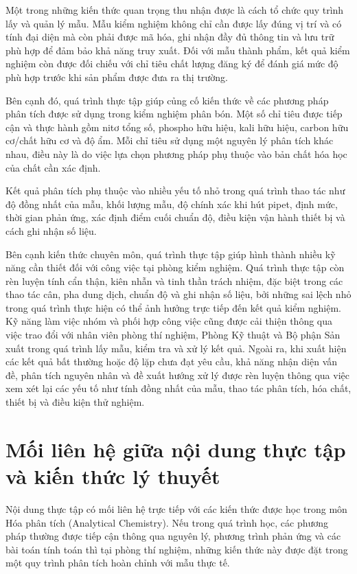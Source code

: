 Một trong những kiến thức quan trọng thu nhận được là cách tổ chức quy trình lấy và quản lý mẫu. 
Mẫu kiểm nghiệm không chỉ cần được lấy đúng vị trí và có tính đại diện mà còn phải được mã hóa, ghi nhận đầy đủ thông tin và lưu trữ phù hợp để đảm bảo khả năng truy xuất. 
Đối với mẫu thành phẩm, kết quả kiểm nghiệm còn được đối chiếu với chỉ tiêu chất lượng đăng ký để đánh giá mức độ phù hợp trước khi sản phẩm được đưa ra thị trường.

Bên cạnh đó, quá trình thực tập giúp củng cố kiến thức về các phương pháp phân tích được sử dụng trong kiểm nghiệm phân bón. 
Một số chỉ tiêu được tiếp cận và thực hành gồm nitơ tổng số, phospho hữu hiệu, kali hữu hiệu, carbon hữu cơ/chất hữu cơ và độ ẩm. 
Mỗi chỉ tiêu sử dụng một nguyên lý phân tích khác nhau, điều này là do việc lựa chọn phương pháp phụ thuộc vào bản chất hóa học của chất cần xác định.

Kết quả phân tích phụ thuộc vào nhiều yếu tố nhỏ trong quá trình thao tác như độ đồng nhất của mẫu, khối lượng mẫu, độ chính xác khi hút pipet, định mức, thời gian phản ứng, xác định điểm cuối chuẩn độ, điều kiện vận hành thiết bị và cách ghi nhận số liệu.

Bên cạnh kiến thức chuyên môn, quá trình thực tập giúp hình thành nhiều kỹ năng cần thiết đối với công việc tại phòng kiểm nghiệm. 
Quá trình thực tập còn rèn luyện tính cẩn thận, kiên nhẫn và tinh thần trách nhiệm, đặc biệt trong các thao tác cân, pha dung dịch, chuẩn độ và ghi nhận số liệu, bởi những sai lệch nhỏ trong quá trình thực hiện có thể ảnh hưởng trực tiếp đến kết quả kiểm nghiệm. 
Kỹ năng làm việc nhóm và phối hợp công việc cũng được cải thiện thông qua việc trao đổi với nhân viên phòng thí nghiệm, Phòng Kỹ thuật và Bộ phận Sản xuất trong quá trình lấy mẫu, kiểm tra và xử lý kết quả. 
Ngoài ra, khi xuất hiện các kết quả bất thường hoặc độ lặp chưa đạt yêu cầu, khả năng nhận diện vấn đề, phân tích nguyên nhân và đề xuất hướng xử lý được rèn luyện thông qua việc xem xét lại các yếu tố như tính đồng nhất của mẫu, thao tác phân tích, hóa chất, thiết bị và điều kiện thử nghiệm.

\section{Mối liên hệ giữa nội dung thực tập và kiến thức lý thuyết}

Nội dung thực tập có mối liên hệ trực tiếp với các kiến thức được học trong môn Hóa phân tích (Analytical Chemistry). Nếu trong quá trình học, các phương pháp thường được tiếp cận thông qua nguyên lý, phương trình phản ứng và các bài toán tính toán thì tại phòng thí nghiệm, những kiến thức này được đặt trong một quy trình phân tích hoàn chỉnh với mẫu thực tế.

